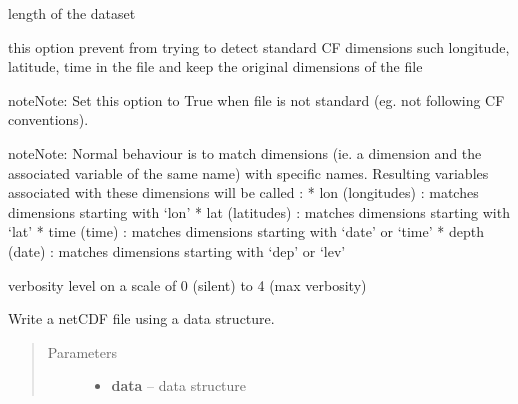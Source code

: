 \documentclass[letterpaper,10pt,english]{sphinxmanual}
\begin{document}
\begin{fulllineitems}
\begin{fulllineitems}
\label{altimetry.tools.nctools:altimetry.tools.nctools.nc.size}
length of the dataset

\end{fulllineitems}


\begin{fulllineitems}
\label{altimetry.tools.nctools:altimetry.tools.nctools.nc.use_local_dims}
this option prevent from trying to detect standard CF dimensions such longitude, latitude, time in the file and keep the original dimensions of the file

\begin{notice}{note}{Note:}
Set this option to True when file is not standard (eg. not following CF conventions).
\end{notice}

\begin{notice}{note}{Note:}
Normal behaviour is to match dimensions (ie. a dimension and the associated variable of the same name) with specific names. Resulting variables associated with these dimensions will be called :
* lon (longitudes) : matches dimensions starting with `lon'
* lat (latitudes) : matches dimensions starting with `lat'
* time (time) : matches dimensions starting with `date' or `time'
* depth (date) : matches dimensions starting with `dep' or `lev'
\end{notice}

\end{fulllineitems}


\begin{fulllineitems}
\label{altimetry.tools.nctools:altimetry.tools.nctools.nc.verbose}
verbosity level on a scale of 0 (silent) to 4 (max verbosity)

\end{fulllineitems}


\begin{fulllineitems}
\label{altimetry.tools.nctools:altimetry.tools.nctools.nc.write}
Write a netCDF file using a data structure.
\begin{quote}\begin{description}
\item[{Parameters}] \leavevmode\begin{itemize}
\item {} 
\textbf{data} -- data structure


\end{itemize}
\end{description}
\end{quote}
\end{fulllineitems}
\end{fulllineitems}
\end{document}

